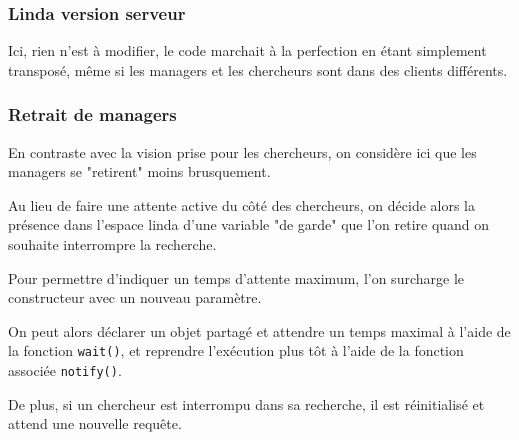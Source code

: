 \documentclass[headings=standardclasses,parskip=half]{scrartcl}
\begin{document}
\subsubsection{Linda version serveur}

Ici, rien n'est à modifier, le code marchait à la perfection en étant simplement transposé,
même si les managers et les chercheurs sont dans des clients différents.

\subsubsection{Retrait de managers}

En contraste avec la vision prise pour les chercheurs, on considère ici que les managers se "retirent"
moins brusquement.

Au lieu de faire une attente active du côté des chercheurs, on décide alors la présence dans
l'espace linda d'une variable "de garde" que l'on retire quand on souhaite interrompre la recherche.

Pour permettre d'indiquer un temps d'attente maximum, l'on surcharge le constructeur avec un nouveau
paramètre.

On peut alors déclarer un objet partagé et attendre un temps maximal à l'aide de la fonction \texttt{wait()},
et reprendre l'exécution plus tôt à l'aide de la fonction associée \texttt{notify()}.

De plus, si un chercheur est interrompu dans sa recherche, il est réinitialisé et attend une nouvelle
requête.
\end{document}
